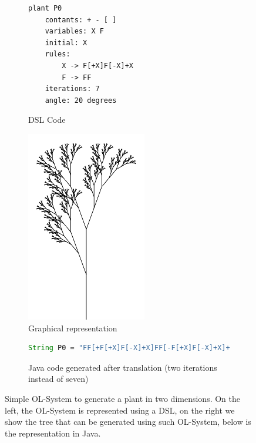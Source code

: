 \begin{figure}[ht]
\begin{mdframed}
\begin{subfigure}{0.45\textwidth}
\begin{lstlisting}[style={OL-systems}]
plant P0
	contants: + - [ ]
	variables: X F
	initial: X
	rules:
		X -> F[+X]F[-X]+X
		F -> FF
	iterations: 7
	angle: 20 degrees
\end{lstlisting}
\caption{DSL Code}\label{fig:l-system-code}
\end{subfigure}
\hspace{0.6cm}
\begin{subfigure}{0.45\textwidth}
\centering
\includegraphics[scale=0.35]{./chapter2/fig/plant.png}
\caption{Graphical representation}\label{fig:plant}
\end{subfigure}
\centering
\begin{subfigure} {0.8\linewidth}
\vspace{1cm}
\begin{lstlisting}[language=java, basicstyle=\footnotesize, stringstyle=\footnotesize\color{green!70!black}]
String P0 = "FF[+F[+X]F[-X]+X]FF[-F[+X]F[-X]+X]+F[+X]F[-X]+X";
\end{lstlisting}
\caption{Java code generated after translation (two iterations instead of seven)}\label{fig:l-system-generated}
\end{subfigure}
\end{mdframed}
\caption{Simple OL-System to generate a plant in two dimensions. On the left, the OL-System is represented using a DSL, on the right we show the tree that can be generated using such OL-System, below is the representation in Java.} \label{lst:OL-system-example}
\end{figure}

